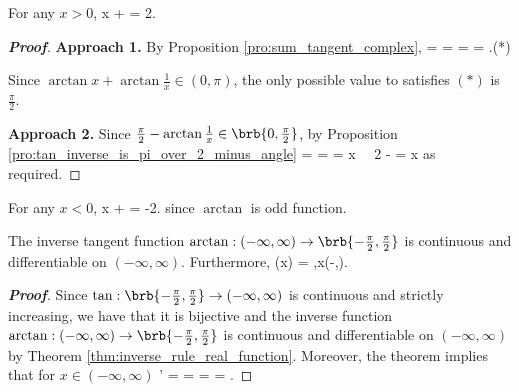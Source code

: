 \begin{proposition}
For any $x>0$, %
\be
\arctan x + \arctan {} = \frac{\pi}2.
\ee
\end{proposition}



\begin{proof}[\bf Proof]
{\bf Approach 1.} By Proposition \ref{pro:sum_tangent_complex},
\be
\tan{} =  =  =  = \infty.\qquad (*)
\ee

Since $\arctan x + \arctan \frac 1{x} \in (0,\pi)$, the only possible value to satisfies $(*)$ is $\frac{\pi}2$.

{\bf Approach 2.} Since $\frac{\pi}2 - \arctan \frac 1{x}\in \brb{0,\frac{\pi}2}$, by Proposition \ref{pro:tan_inverse_is_pi_over_2_minus_angle}
\be
\tan{} =  =  = x \ \ra\ \frac{\pi}2 - \arctan {} = \arctan x
\ee
as required.
\end{proof}

\begin{remark}
For any $x<0$,
\be
\arctan x + \arctan {} = -\frac{\pi}2.
\ee
since $\arctan$ is odd function.
\end{remark}



\begin{theorem}
The inverse tangent function $\arctan:(-\infty,\infty)\to \brb{-\frac{\pi}2,\frac{\pi}2}$ is continuous and differentiable on $(-\infty,\infty)$. Furthermore,
\be
{} \arctan(x) = ,\qquad x\in (-\infty,\infty).
\ee
\end{theorem}

\begin{proof}[\bf Proof]
Since $\tan:\brb{-\frac{\pi}2,\frac{\pi}2}\to (-\infty,\infty)$ is continuous and strictly increasing, we have that it is bijective and the inverse function $\arctan:(-\infty,\infty)\to \brb{-\frac{\pi}2,\frac{\pi}2}$ is continuous and differentiable on $(-\infty,\infty)$ by Theorem \ref{thm:inverse_rule_real_function}. Moreover, the theorem implies that for $x\in (-\infty,\infty)$
\be
{}' =  =  =  = .
\ee
\end{proof}


